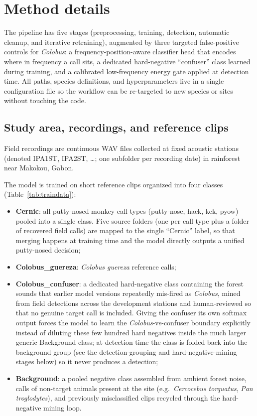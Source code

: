 \documentclass[final,3p,times]{elsarticle}
\begin{document}
\section*{Method details}

The pipeline has five stages (preprocessing, training, detection, automatic
cleanup, and iterative retraining), augmented by three targeted
false-positive controls for \textit{Colobus}: a frequency-position-aware
classifier head that encodes where in frequency a call sits, a
dedicated hard-negative ``confuser'' class learned during training, and a
calibrated low-frequency energy gate applied at detection time. All paths,
species definitions, and hyperparameters live in a single configuration file so
the workflow can be re-targeted to new species or sites without touching the
code.

\subsection*{Study area, recordings, and reference clips}

Field recordings are continuous WAV files collected at fixed acoustic stations
(denoted IPA1ST, IPA2ST, \dots; one subfolder per recording date) in
rainforest near Makokou, Gabon.

The model is trained on short reference clips organized into four classes
(Table~\ref{tab:traindata}):
\begin{itemize}
\item \textbf{Cernic}: all putty-nosed monkey call types (putty-nose, hack,
kek, pyow) pooled into a single class. Five source folders (one per call type
plus a folder of recovered field calls) are mapped to
the single ``Cernic'' label, so that
merging happens at training time and the model directly outputs a unified
putty-nosed decision;
\item \textbf{Colobus\_guereza}: \textit{Colobus guereza} reference calls;
\item \textbf{Colobus\_confuser}: a dedicated hard-negative class containing
the forest sounds that earlier model versions repeatedly mis-fired as
\textit{Colobus}, mined from field detections across the development stations
and human-reviewed so that no genuine target call is included.
Giving the confuser its own softmax output forces the model to learn the
\textit{Colobus}-vs-confuser boundary explicitly instead of diluting these few
hundred hard negatives inside the much larger generic Background class; at
detection time the class is folded back into the background group (see
the detection-grouping and hard-negative-mining stages below) so it never
produces a detection;
\item \textbf{Background}: a pooled negative class assembled from ambient
forest noise, calls of non-target animals present at the site (e.g.\
\textit{Cercocebus torquatus}, \textit{Pan troglodytes}), and previously
misclassified clips recycled through the hard-negative mining loop.
\end{itemize}
\end{document}
